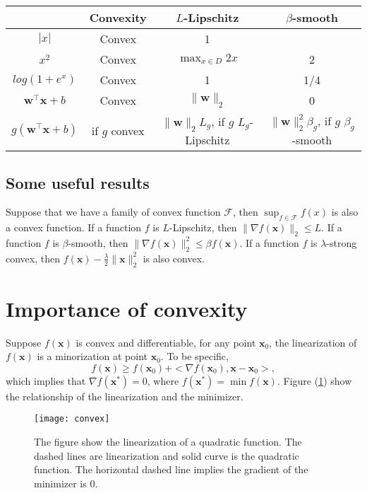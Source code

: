 \documentclass[12pt]{report}
\def\bx{\bm{x}}
\def\bw{\bm{w}}
\begin{document}
\begin{center}
\begin{tabular}{ |c|c|c|c| }
\hline
  & Convexity & $L$-Lipschitz & $\beta$-smooth \\ 
 \hline
 $|x|$& Convex & 1 &  \\  
 $x^2$& Convex & $\max_{x\in D}  2x$ & 2\\
 $log(1+e^x)$& Convex & 1 & 1/4\\
 $\bw^\top\bx+b$ & Convex & $\|\bw\|_2$ & 0\\
 $g(\bw^\top\bx+b)$ & if $g$ convex & $\|\bw\|_2L_g$, if $g$ $L_g$-Lipschitz & $\|\bw\|_2^2\beta_g$, if $g$ $\beta_g$-smooth\\
 \hline
\end{tabular}
\label{tab:1}
\end{center}

\subsection{Some useful results}

Suppose that we have a family of convex function $\mathcal{F}$, then $\sup_{f\in \mathcal{F}} f(x)$ is also a convex function. If a function $f$ is $L$-Lipschitz, then $\|\nabla f(\bx)\|_2\leq L$. If a function $f$ is $\beta$-smooth, then $\|\nabla f(\bx)\|_2^2\leq \beta f(\bx)$. If a function $f$ is $\lambda$-strong convex, then $f(\bx)-\frac{\lambda}{2}\|\bx\|_2^2$ is also convex.

\section{Importance of convexity}

Suppose $f(\bx)$ is convex and differentiable, for any point $\bx_0$, the linearization of $f(\bx)$ is a minorization at point $\bx_0$. To be specific,
\begin{equation}
f(\bx)\geq f(\bx_0)+<\nabla f(\bx_0), \bx-\bx_0>,
\end{equation} 
which implies that $\nabla f(\bx^*)=0$, where $f(\bx^*)=\min f(\bx)$. Figure (\ref{Fig:convex}) show the relationship of the linearization and the minimizer.

\begin{figure}
\texttt{[image: convex]}
\label{Fig:convex}
\caption{The figure show the linearization of a quadratic function. The dashed lines are linearization and solid curve is the quadratic function. The horizontal dashed line implies the gradient of the minimizer is 0. }
\end{figure}
\end{document}
